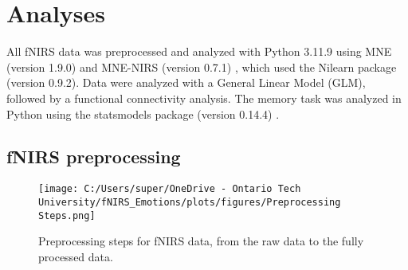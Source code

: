 \section{Analyses}
All fNIRS data was preprocessed and analyzed with Python 3.11.9 using MNE (version 1.9.0) \citep{gramfort_meg_2013} and MNE-NIRS (version 0.7.1) \citep{luke_analysis_2021}, which used the Nilearn package (version 0.9.2). 
Data were analyzed with a General Linear Model (GLM), followed by a functional connectivity analysis.
The memory task was analyzed in Python using the statsmodels package (version 0.14.4) \citep{seabold2010statsmodels}. 

\subsection{fNIRS preprocessing}
\label{sec:preprocessing}
\begin{figure}[H]
    \centering
    \texttt{[image: C:/Users/super/OneDrive - Ontario Tech University/fNIRS\_Emotions/plots/figures/Preprocessing Steps.png]}
    \caption[Preprocessing steps for fNIRS data]{Preprocessing steps for fNIRS data, from the raw data to the fully processed data. }
    \label{fig:preprocessing_steps}
\end{figure}

